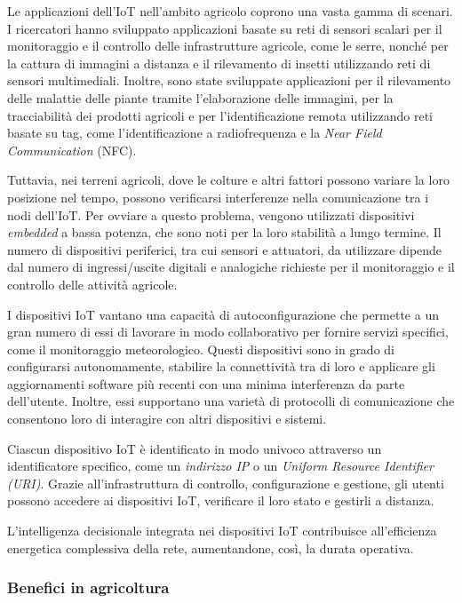Le applicazioni dell'IoT nell'ambito agricolo coprono una vasta gamma di scenari. I ricercatori hanno sviluppato applicazioni basate su reti di sensori scalari per il monitoraggio e il controllo delle infrastrutture agricole, come le serre, nonché per la cattura di immagini a distanza e il rilevamento di insetti utilizzando reti di sensori multimediali. Inoltre, sono state sviluppate applicazioni per il rilevamento delle malattie delle piante tramite l'elaborazione delle immagini, per la tracciabilità dei prodotti agricoli e per l'identificazione remota utilizzando reti basate su tag, come l'identificazione a radiofrequenza e la \textit{Near Field Communication} (NFC).

Tuttavia, nei terreni agricoli, dove le colture e altri fattori possono variare la loro posizione nel tempo, possono verificarsi interferenze nella comunicazione tra i nodi dell'IoT. Per ovviare a questo problema, vengono utilizzati dispositivi \textit{embedded} a bassa potenza, che sono noti per la loro stabilità a lungo termine. Il numero di dispositivi periferici, tra cui sensori e attuatori, da utilizzare dipende dal numero di ingressi/uscite digitali e analogiche richieste per il monitoraggio e il controllo delle attività agricole.

I dispositivi IoT vantano una capacità di autoconfigurazione che permette a un gran numero di essi di lavorare in modo collaborativo per fornire servizi specifici, come il monitoraggio meteorologico. Questi dispositivi sono in grado di configurarsi autonomamente, stabilire la connettività tra di loro e applicare gli aggiornamenti software più recenti con una minima interferenza da parte dell'utente. Inoltre, essi supportano una varietà di protocolli di comunicazione che consentono loro di interagire con altri dispositivi e sistemi.

Ciascun dispositivo IoT è identificato in modo univoco attraverso un identificatore specifico, come un \textit{indirizzo IP} o un \textit{Uniform Resource Identifier (URI)}. Grazie all'infrastruttura di controllo, configurazione e gestione, gli utenti possono accedere ai dispositivi IoT, verificare il loro stato e gestirli a distanza.

L'intelligenza decisionale integrata nei dispositivi IoT contribuisce all'efficienza energetica complessiva della rete, aumentandone, così, la durata operativa.

\subsubsection{Benefici in agricoltura}

